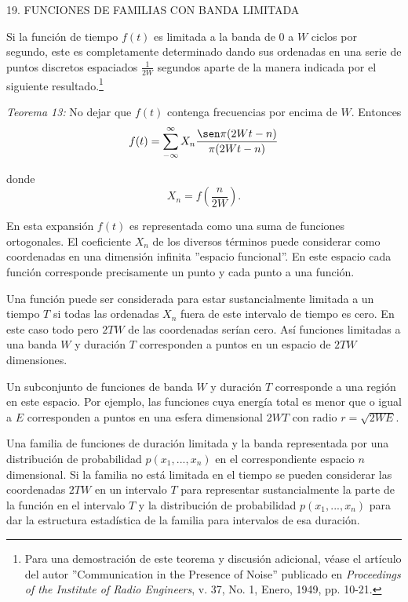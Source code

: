 19. FUNCIONES DE FAMILIAS CON BANDA LIMITADA
\newline

Si la funci\'on de tiempo $f(t)$ es limitada a la banda de 0 a $W$ ciclos por
segundo, este es completamente determinado dando sus ordenadas en una serie de
puntos discretos espaciados $\frac{1}{2W}$ segundos aparte de la manera indicada
por el siguiente resultado.\footnote[5]{Para una demostraci\'on de este teorema
y discusi\'on adicional, v\'ease el art\'iculo del autor ''Communication in the
Presence of Noise'' publicado en {\em Proceedings of the Institute of Radio
Engineers}, v. 37, No. 1, Enero, 1949, pp. 10-21.}

{\em Teorema 13:} No dejar que $f(t)$ contenga frecuencias por encima de $W$.
Entonces
\begin{equation}
  f(t) = \sum_{-\infty}^{\infty} X_n \frac{\sen \pi(2Wt-n)}{\pi(2Wt-n)}
\end{equation}

donde
\begin{equation}
  X_n = f\left(\frac{n}{2W} \right).
\end{equation}


En esta expansi\'on $f(t)$ es representada como una suma de funciones
ortogonales. El coeficiente $X_n$ de los diversos t\'erminos puede considerar
como coordenadas en una dimensi\'on infinita ''espacio funcional''. En este
espacio cada funci\'on corresponde precisamente un punto y cada punto a una
funci\'on.

Una funci\'on puede ser considerada para estar sustancialmente limitada a un
tiempo $T$ si todas las ordenadas $X_n$ fuera de este intervalo de tiempo es
cero. En este caso todo pero $2TW$ de las coordenadas ser\'ian cero. As\'i
funciones limitadas a una banda $W$ y duraci\'on $T$ corresponden a puntos en
un espacio de $2TW$ dimensiones.

Un subconjunto de funciones de banda $W$ y duraci\'on $T$ corresponde a una
regi\'on en este espacio. Por ejemplo, las funciones cuya energ\'ia total es
menor que o igual a $E$ corresponden a puntos en una esfera dimensional $2WT$
con radio $r=\sqrt{2WE}$.

Una familia de funciones de duraci\'on limitada y la banda representada por una
distribuci\'on de probabilidad $p(x_1, ..., x_n)$ en el correspondiente espacio
$n$ dimensional. Si la familia no est\'a limitada en el tiempo se pueden
considerar las coordenadas $2TW$ en un intervalo $T$ para representar
sustancialmente la parte de la funci\'on en el intervalo $T$ y la distribuci\'on
de probabilidad $p(x_1, ..., x_n)$ para dar la estructura estad\'istica de la
familia para intervalos de esa duraci\'on.
\newline

